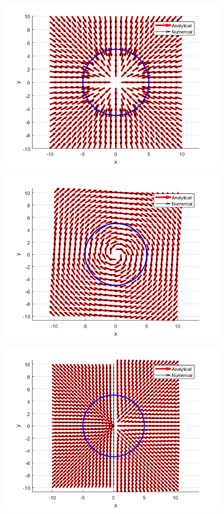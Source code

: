 \documentclass[numbered,pdftex]{ohio-etd}
\begin{document}
\begin{figure}[h]
	\centering
	\includegraphics[width=0.7\linewidth]{PaperFigures/convergence}
	\caption{}
	\label{fig:convergence}
	
\end{figure}

\begin{figure}[h]
	\centering
	\includegraphics[width=0.7\linewidth]{PaperFigures/circulation}
	\caption{}
	\label{fig:circulation}
\end{figure}

\begin{figure}[h]
	\centering
	\includegraphics[width=0.7\linewidth]{"PaperFigures/time varying"}
	\caption{}
	\label{fig:time-varying}
\end{figure}
\end{document}
